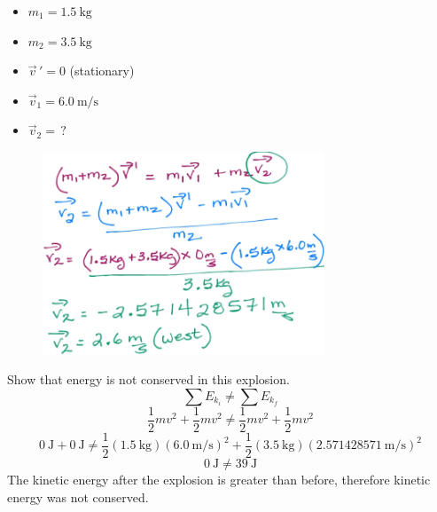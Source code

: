 \documentclass[a4paper,12pt]{article}
\begin{document}
\begin{itemize}
    \item{$m_1 = \SI{1.5}{\kg}$}
    \item{$m_2 = \SI{3.5}{\kg}$}
    \item{$\vec{v}\,' = 0$ (stationary)}
    \item{$\vec{v}_1 = \SI{6.0}{\m/\s}$}
    \item{$\vec{v}_2 = \,?$}
\end{itemize}

\begin{figure}[H]
    \centering
    \includegraphics[width=0.75\textwidth]{q-explode-3a}
\end{figure}

Show that energy is not conserved in this explosion.
$$\sum{E_{k_i}} \neq \sum{E_{k_f}}$$
$$\frac{1}{2}mv^2 + \frac{1}{2}mv^2 \neq \frac{1}{2}mv^2 + \frac{1}{2}mv^2$$
$$\SI{0}{\J} + \SI{0}{\J} \neq \frac{1}{2}(\SI{1.5}{\kg})(\SI{6.0}{\m/\s})^2 + \frac{1}{2}(\SI{3.5}{\kg})(\SI{2.571428571}{\m/\s})^2$$
$$\SI{0}{\J} \neq \SI{39}{\J}$$
The kinetic energy after the explosion is greater than before, therefore kinetic energy was not conserved.

\pagebreak
\end{document}
